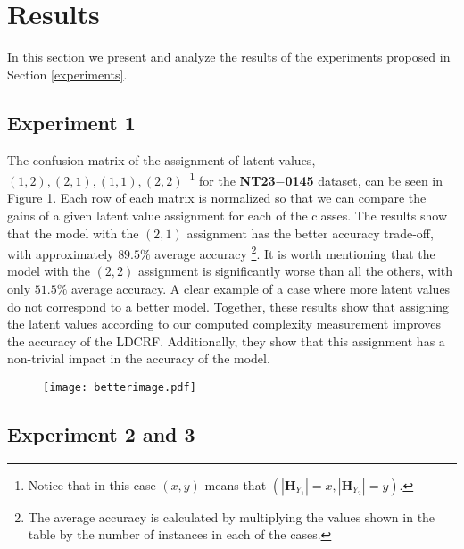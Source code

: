 \documentclass[10pt, conference]{IEEEtran}
\begin{document}
\section{Results}
In this section we present and analyze the results of the experiments proposed in Section \ref{experiments}.

\subsection{Experiment 1}


The confusion matrix of the assignment of latent values, $(1,2),(2,1),(1,1),(2,2)$~\footnote{Notice that in this case $(x,y)$ means that $(|\mathbf{H}_{Y_1}| = x, |\mathbf{H}_{Y_2}| = y)$.}  for the \textbf{NT23$-$0145} dataset, can be seen in Figure \ref{cm12}. Each row of each matrix is normalized so that we can compare the gains of a given latent value assignment for each of the classes.
The results show that the model with the $(2,1)$ assignment has the better accuracy trade-off,  with approximately  $89.5\%$  average accuracy \footnote{The average accuracy is calculated by multiplying the values shown in the table by the number of instances in each of the cases.}.
It is worth mentioning that the model with the $(2,2)$ assignment is significantly worse than all the others, with only $51.5\%$ average accuracy. A clear example of a case where  more latent values do not correspond to a better model.
Together, these results show that assigning the latent values according to our computed complexity measurement improves the accuracy of the LDCRF. Additionally, they show that this assignment has a non-trivial impact in the accuracy of the model.

\begin{figure}[t]
	\begin{center}
		\texttt{[image: betterimage.pdf]}
	\end{center}
	\label{cm12}
\end{figure}


\subsection{Experiment 2 and 3}
\end{document}
